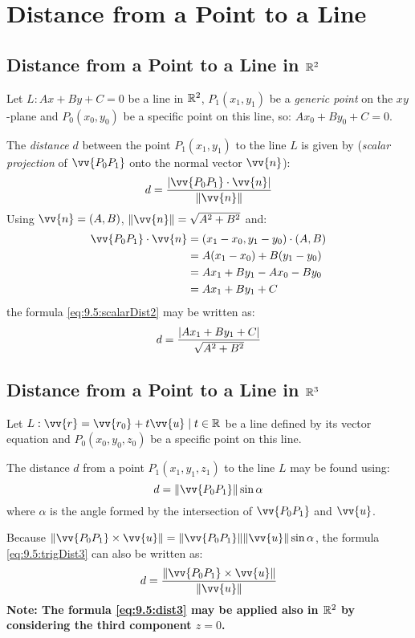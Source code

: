 \section{Distance from a Point to a Line}
\subsection{Distance from a Point to a Line in $\mathbb{R}^2$}
	Let $L: Ax + By + C = 0$ be a line in $\mathbb{R}^2$, $P_1(x_1,y_1)$ be a \emph{generic point} on the $xy$-plane and $P_0(x_0,y_0)$ be a specific point on this line, so: $Ax_0 + By_0 + C = 0$.

	The \emph{distance} $d$ between the point $P_1(x_1,y_1)$ to the line $L$ is given by (\emph{scalar projection} of $\vv{P_0P_1}$ onto the normal vector $\vv{n}$):
	\begin{equation}\label{eq:9.5:scalarDist2}
		d = \frac{\abs{\vv{P_0P_1} \cdot \vv{n}}}{\norm{\vv{n}}}
	\end{equation}
	Using $\vv{n} = (A, B)$, $\norm{\vv{n}} = \sqrt{A^2 + B^2}$ and:
	\begin{align*}
		\vv{P_0P_1} \cdot \vv{n} &= (x_1 - x_0, y_1 - y_0) \cdot (A, B)\\
		                         &= A(x_1 - x_0) + B(y_1 - y_0)\\
					 &= Ax_1 + By_1 - Ax_0 - By_0\\
					 &= Ax_1 + By_1 + C
	\end{align*}
	the formula \eqref{eq:9.5:scalarDist2} may be written as:
	\begin{equation}\label{eq:9.5:dist2}
		d = \frac{\lvert Ax_1 + By_1 + C \rvert}{\sqrt{A^2 + B^2}}
	\end{equation}
\subsection{Distance from a Point to a Line in $\mathbb{R}^3$}
	Let $L: \vv{r} = \vv{r_0} + t\vv{u} \such t \in \real$ be a line defined by its vector equation and $P_0(x_0,y_0,z_0)$ be a specific point on this line.

	The distance $d$ from a point $P_1(x_1,y_1,z_1)$ to the line $L$ may be found using:
	\begin{equation}\label{eq:9.5:trigDist3}
		d = \norm{\vv{P_0P_1}} \sin \alpha
	\end{equation}
	where $\alpha$ is the angle formed by the intersection of $\vv{P_0P_1}$ and $\vv{u}$.
	
	Because $\norm{\vv{P_0P_1} \times \vv{u}} = \norm{\vv{P_0P_1}} \norm{\vv{u}} \sin \alpha$, the formula \eqref{eq:9.5:trigDist3} can also be written as:
	\begin{equation}\label{eq:9.5:dist3}
		d = \frac{\norm{\vv{P_0P_1} \times \vv{u}}}{\norm{\vv{u}}}
	\end{equation}
	\textbf{Note: The formula \eqref{eq:9.5:dist3} may be applied also in $\mathbb{R}^2$ by considering the third component $z = 0$.}
